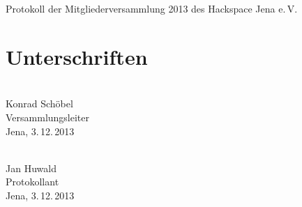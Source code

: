 \documentclass[ngerman]{scrartcl}
\begin{document}
\begin{Protokoll}{Protokoll der Mitgliederversammlung 2013 des Hackspace
    Jena e.\,V.}
\newpage
\section{Unterschriften}
\vspace{2cm}
\begin{multicols}{2}
  \noindent \makebox[5cm]{\hrulefill} \\
  Konrad Schöbel \\
  Versammlungsleiter \\
  Jena, 3.\,12.\,2013

  \noindent \makebox[5cm]{\hrulefill} \\
  Jan Huwald \\
  Protokollant \\
  Jena, 3.\,12.\,2013
\end{multicols}

\end{Protokoll}
\end{document}
